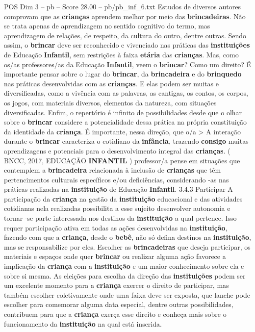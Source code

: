 \begin{textsample}{POS Dim 3 – pb – Score 28.00 – pb/pb\_inf\_6.txt}
Estudos de diversos autores comprovam que as \textbf{crianças} aprendem melhor por meio das \textbf{brincadeiras}.
Não se trata apenas de aprendizagem no sentido cognitivo do termo, mas aprendizagem de relações, de respeito, da cultura do outro, dentre outras.
Sendo assim, o \textbf{brincar} deve ser reconhecido e vivenciado nas práticas das \textbf{instituições} de Educação \textbf{Infantil}, sem restrições à faixa \textbf{etária} das \textbf{crianças}.
Mas, como os/as professores/as da Educação \textbf{Infantil}, veem o \textbf{brincar}?
Como um direito?
É importante pensar sobre o lugar do \textbf{brincar}, da \textbf{brincadeira} e do \textbf{brinquedo} nas práticas desenvolvidas com as \textbf{crianças}.
E elas podem ser muitas e diversificadas, como a vivência com as palavras, as cantigas, os contos, os corpos, os jogos, com materiais diversos, elementos da natureza, com situações diversificadas.
Enfim, o repertório é infinito de possibilidades desde que o olhar sobre o \textbf{brincar} considere a potencialidade dessa prática na própria constituição da identidade da \textbf{criança}.
É importante, nessa direção, que o/a > A interação durante o \textbf{brincar} caracteriza o cotidiano da \textbf{infância}, trazendo \textbf{consigo} muitas aprendizagens e potenciais para o desenvolvimento integral das \textbf{crianças}. ( BNCC, 2017, EDUCAÇÃO \textbf{INFANTIL} ) professor/a pense em situações que contemplem a \textbf{brincadeira} relacionada à inclusão de \textbf{crianças} que têm pertencimentos culturais específicos e/ou deficiências, considerando -as nas práticas realizadas na \textbf{instituição} de Educação \textbf{Infantil}. 3.4.3 Participar A participação da \textbf{criança} na gestão da \textbf{instituição} educacional e das atividades cotidianas nela realizadas possibilita a esse sujeito desenvolver autonomia e tornar -se parte interessada nos destinos da \textbf{instituição} a qual pertence.
Isso requer participação ativa em todas as ações desenvolvidas na \textbf{instituição}, fazendo com que a \textbf{criança}, desde o \textbf{bebê}, não só defina destinos na \textbf{instituição}, mas se responsabilize por eles.
Escolher as \textbf{brincadeiras} que deseja participar, os materiais e espaços onde quer \textbf{brincar} ou realizar alguma ação favorece a implicação da \textbf{criança} com a \textbf{instituição} e um maior conhecimento sobre ela e sobre si mesma.
As eleições para escolha da direção das \textbf{instituições} podem ser um excelente momento para a \textbf{criança} exercer o direito de participar, mas também escolher coletivamente onde uma faixa deve ser exposta, que lanche pode escolher para comemorar alguma data especial, dentre outras possibilidades, contribuem para que a \textbf{criança} exerça esse direito e conheça mais sobre o funcionamento da \textbf{instituição} na qual está inserida.

\end{textsample}
